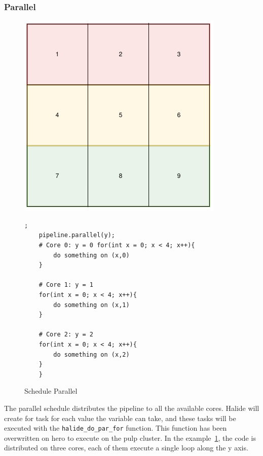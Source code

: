 \subsubsection{Parallel}
\begin{figure}[H]

		\begin{minipage}[c]{\EIW}
			\centering
		\includegraphics[width=\textwidth]{Images/Parallel.png}
		\end{minipage}
		\begin{minipage}[c]{\ECW}
			\centering
			\begin{lstlisting}[label={code:reorder}];
	pipeline.parallel(y);
	# Core 0: y = 0 for(int x = 0; x < 4; x++){
		do something on (x,0)
	}

	# Core 1: y = 1
	for(int x = 0; x < 4; x++){
		do something on (x,1)
	}

	# Core 2: y = 2
	for(int x = 0; x < 4; x++){
		do something on (x,2)
	}
	}
\end{lstlisting}
		\end{minipage}
		\caption{Schedule Parallel}
		\label{schedule:parallel}
\end{figure}


The parallel schedule distributes the pipeline to all the available cores. Halide will create for task for each value the variable can take, and these tasks will be executed with the \verb|halide_do_par_for| function. This function has been overwritten on hero to execute on the \gls{pulp} cluster. In the example~\ref{schedule:parallel}, the code is distributed on three cores, each of them execute a single loop along the y axis.

